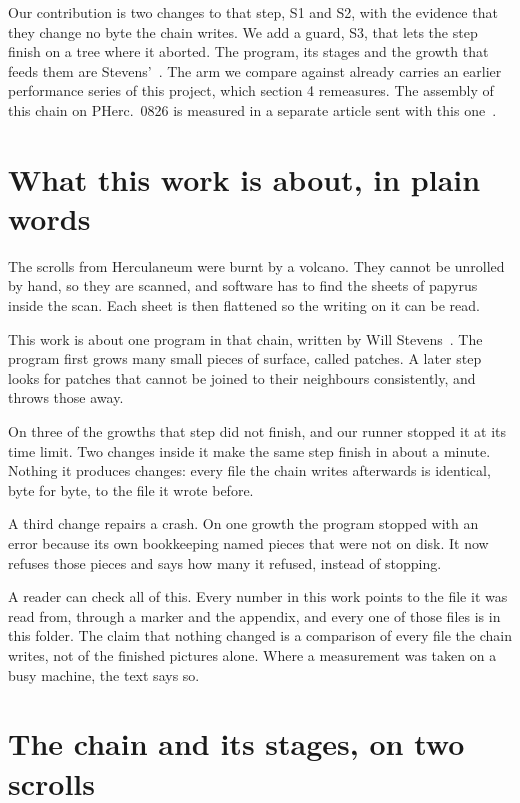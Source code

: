 Our contribution is two changes to that step, S1 and S2, with the evidence that they change no byte the chain writes. We add a guard, S3, that lets the step finish on a tree where it aborted. The program, its stages and the growth that feeds them are Stevens'~\cite{stevensrepo}. The arm we compare against already carries an earlier performance series of this project, which section 4 remeasures. The assembly of this chain on PHerc.~0826 is measured in a separate article sent with this one~\cite{pherc0826chain}.

\section*{What this work is about, in plain words}

The scrolls from Herculaneum were burnt by a volcano. They cannot be unrolled by hand, so they are scanned, and software has to find the sheets of papyrus inside the scan. Each sheet is then flattened so the writing on it can be read.

This work is about one program in that chain, written by Will Stevens~\cite{stevensrepo}. The program first grows many small pieces of surface, called patches. A later step looks for patches that cannot be joined to their neighbours consistently, and throws those away.

On three of the growths that step did not finish, and our runner stopped it at its time limit. Two changes inside it make the same step finish in about a minute. Nothing it produces changes: every file the chain writes afterwards is identical, byte for byte, to the file it wrote before.

A third change repairs a crash. On one growth the program stopped with an error because its own bookkeeping named pieces that were not on disk. It now refuses those pieces and says how many it refused, instead of stopping.

A reader can check all of this. Every number in this work points to the file it was read from, through a marker and the appendix, and every one of those files is in this folder. The claim that nothing changed is a comparison of every file the chain writes, not of the finished pictures alone. Where a measurement was taken on a busy machine, the text says so.

\section{The chain and its stages, on two scrolls}

